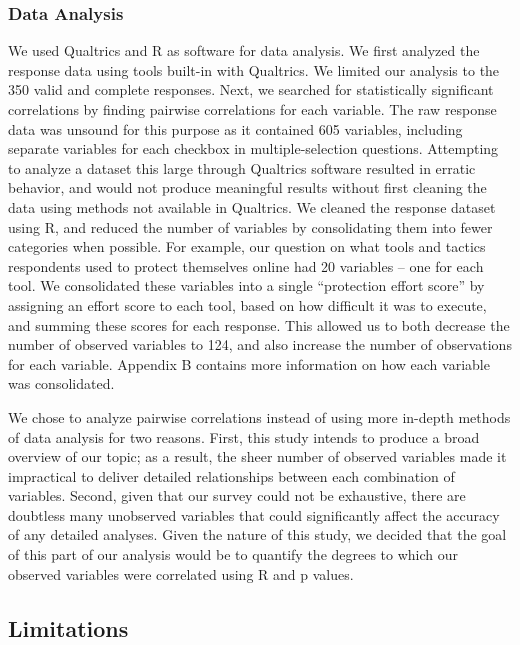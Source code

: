 \subsubsection{Data Analysis}

We used Qualtrics and R as software for data analysis. We first analyzed the response data using tools built-in with Qualtrics. We limited our analysis to the 350 valid and complete responses.
Next, we searched for statistically significant correlations by finding pairwise correlations for each variable. The raw response data was unsound for this purpose as it contained 605 variables, including separate variables for each checkbox in multiple-selection questions. Attempting to analyze a dataset this large through Qualtrics software resulted in erratic behavior, and would not produce meaningful results without first cleaning the data using methods not available in Qualtrics. We cleaned the response dataset using R, and reduced the number of variables by consolidating them into fewer categories when possible. For example, our question on what tools and tactics respondents used to protect themselves online had 20 variables -- one for each tool. We consolidated these variables into a single “protection effort score” by assigning an effort score to each tool, based on how difficult it was to execute, and summing these scores for each response. This allowed us to both decrease the number of observed variables to 124, and also increase the number of observations for each variable. Appendix B contains more information on how each variable was consolidated.

We chose to analyze pairwise correlations instead of using more in-depth methods of data analysis for two reasons. First, this study intends to produce a broad overview of our topic; as a result, the sheer number of observed variables made it impractical to deliver detailed relationships between each combination of variables. Second, given that our survey could not be exhaustive, there are doubtless many unobserved variables that could significantly affect the accuracy of any detailed analyses. Given the nature of this study, we decided that the goal of this part of our analysis would be to quantify the degrees to which our observed variables were correlated using R and p values.

\subsection{Limitations}

